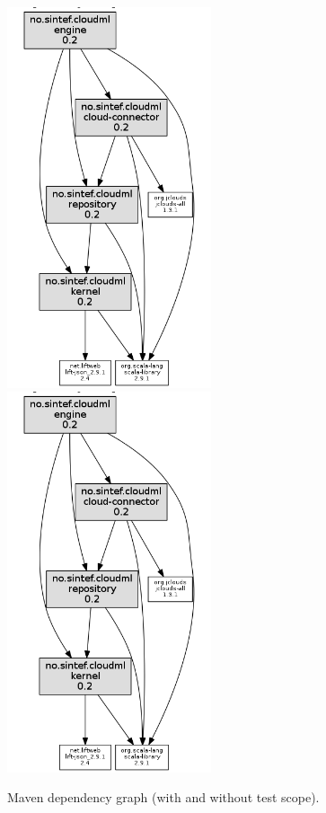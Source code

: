 \begin{figure}
  \includegraphics[width=6cm]{img/dependency-graph.png}
  \includegraphics[width=6cm]{img/dependency-graph.png}
  \caption{Maven dependency graph (with and without test scope).}
  \label{fig:dependendy-graph}
\end{figure}
